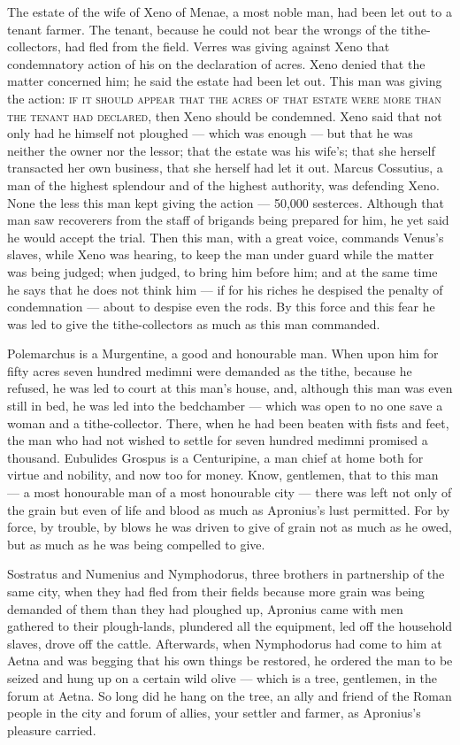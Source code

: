  The estate of the wife of Xeno of Menae, a most noble man, had been let out to a tenant farmer. The tenant, because he could not bear the wrongs of the tithe-collectors, had fled from the field. Verres was giving against Xeno that condemnatory action of his on the declaration of acres. Xeno denied that the matter concerned him; he said the estate had been let out. This man was giving the action: \textsc{if it should appear that the acres of that estate were more than the tenant had declared}, then Xeno should be condemned. Xeno said that not only had he himself not ploughed --- which was enough --- but that he was neither the owner nor the lessor; that the estate was his wife's; that she herself transacted her own business, that she herself had let it out. Marcus Cossutius, a man of the highest splendour and of the highest authority, was defending Xeno. None the less this man kept giving the action --- 50,000 sesterces. Although that man saw recoverers from the staff of brigands being prepared for him, he yet said he would accept the trial. Then this man, with a great voice, commands Venus's slaves, while Xeno was hearing, to keep the man under guard while the matter was being judged; when judged, to bring him before him; and at the same time he says that he does not think him --- if for his riches he despised the penalty of condemnation --- about to despise even the rods. By this force and this fear he was led to give the tithe-collectors as much as this man commanded.

 Polemarchus is a Murgentine, a good and honourable man. When upon him for fifty acres seven hundred medimni were demanded as the tithe, because he refused, he was led to court at this man's house, and, although this man was even still in bed, he was led into the bedchamber --- which was open to no one save a woman and a tithe-collector. There, when he had been beaten with fists and feet, the man who had not wished to settle for seven hundred medimni promised a thousand. Eubulides Grospus is a Centuripine, a man chief at home both for virtue and nobility, and now too for money. Know, gentlemen, that to this man --- a most honourable man of a most honourable city --- there was left not only of the grain but even of life and blood as much as Apronius's lust permitted. For by force, by trouble, by blows he was driven to give of grain not as much as he owed, but as much as he was being compelled to give.

 Sostratus and Numenius and Nymphodorus, three brothers in partnership of the same city, when they had fled from their fields because more grain was being demanded of them than they had ploughed up, Apronius came with men gathered to their plough-lands, plundered all the equipment, led off the household slaves, drove off the cattle. Afterwards, when Nymphodorus had come to him at Aetna and was begging that his own things be restored, he ordered the man to be seized and hung up on a certain wild olive --- which is a tree, gentlemen, in the forum at Aetna. So long did he hang on the tree, an ally and friend of the Roman people in the city and forum of allies, your settler and farmer, as Apronius's pleasure carried.

